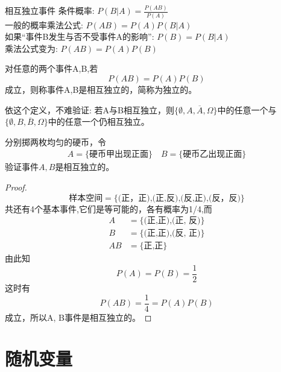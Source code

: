 \begin{frame}{相互独立事件}
条件概率: $P(B|A)=\frac{P(AB)}{P(A)}$\\
一般的概率乘法公式: $P(AB)=P(A)P(B|A)$\\
如果``事件B发生与否不受事件A的影响'': $P(B)=P(B|A)$\\
乘法公式变为: $P(AB)=P(A)P(B)$
\begin{definition}
对任意的两个事件A,B,若
\[P(AB)=P(A)P(B)\]
成立，则称事件A,B是相互独立的，简称为独立的。	
\end{definition}
\begin{block}{依这个定义，不难验证:}
	若A与B相互独立，则$\{\emptyset,A,\overline{A},\Omega\}$中的任意一个与$\{\emptyset,B,\overline{B},\Omega\}$中的任意一个仍相互独立。
\end{block}
\end{frame}

\begin{frame}[shrink]
		分别掷两枚均匀的硬币，令
		\begin{align*}
		A=\{\text{硬币甲出现正面} \}\quad	B=\{\text{硬币乙出现正面} \}
		\end{align*}
		验证事件$A,B$是相互独立的。
 \begin{proof}
			$$\text{样本空间}=\{\text{(正，正),(正,反),(反,正),(反，反)}\} $$
			共还有4个基本事件,它们是等可能的，各有概率为1/4,而
			\begin{align*}
			A&=\{\text{(正,正),(正, 反)}\} \\
			B&=\{\text{(正,正),(反, 正)}\} \\
			AB&=\{\text{正,正}\}
			\end{align*}
			由此知 \[P(A)=P(B)=\frac{1}{2}\]
			这时有 \[P(AB)=\frac{1}{4}=P(A)P(B)\]
			成立，所以A, B事件是相互独立的。
 \end{proof}
\end{frame}

\section{随机变量}

